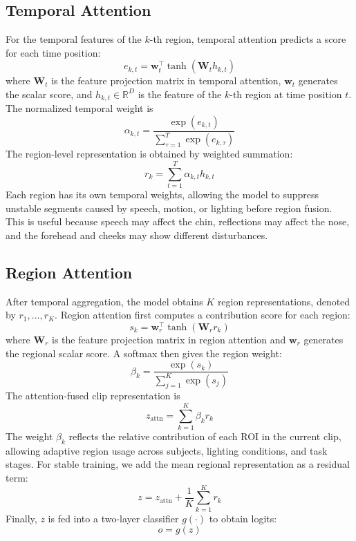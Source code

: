 \documentclass[runningheads]{llncs}
\begin{document}
\subsection{Temporal Attention}

For the temporal features of the $k$-th region, temporal attention predicts a score for each time position:
\begin{equation}
    e_{k,t} = \mathbf{w}_t^\top \tanh(\mathbf{W}_t h_{k,t})
\end{equation}
where $\mathbf{W}_t$ is the feature projection matrix in temporal attention, $\mathbf{w}_t$ generates the scalar score, and $h_{k,t} \in \mathbb{R}^{D}$ is the feature of the $k$-th region at time position $t$. The normalized temporal weight is
\begin{equation}
    \alpha_{k,t} = \frac{\exp(e_{k,t})}{\sum_{\tau=1}^{T}\exp(e_{k,\tau})}
\end{equation}
The region-level representation is obtained by weighted summation:
\begin{equation}
    r_k = \sum_{t=1}^{T}\alpha_{k,t} h_{k,t}
\end{equation}
Each region has its own temporal weights, allowing the model to suppress unstable segments caused by speech, motion, or lighting before region fusion. This is useful because speech may affect the chin, reflections may affect the nose, and the forehead and cheeks may show different disturbances.

\subsection{Region Attention}

After temporal aggregation, the model obtains $K$ region representations, denoted by $r_1,\ldots,r_K$. Region attention first computes a contribution score for each region:
\begin{equation}
    s_k = \mathbf{w}_r^\top \tanh(\mathbf{W}_r r_k)
\end{equation}
where $\mathbf{W}_r$ is the feature projection matrix in region attention and $\mathbf{w}_r$ generates the regional scalar score. A softmax then gives the region weight:
\begin{equation}
    \beta_k = \frac{\exp(s_k)}{\sum_{j=1}^{K}\exp(s_j)}
\end{equation}
The attention-fused clip representation is
\begin{equation}
    z_{\mathrm{attn}} = \sum_{k=1}^{K}\beta_k r_k
\end{equation}
The weight $\beta_k$ reflects the relative contribution of each ROI in the current clip, allowing adaptive region usage across subjects, lighting conditions, and task stages. For stable training, we add the mean regional representation as a residual term:
\begin{equation}
    z = z_{\mathrm{attn}} + \frac{1}{K}\sum_{k=1}^{K} r_k
\end{equation}
Finally, $z$ is fed into a two-layer classifier $g(\cdot)$ to obtain logits:
\begin{equation}
    o = g(z)
\end{equation}
\end{document}
